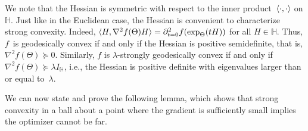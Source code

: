 \documentclass[aos]{imsart}
\theoremstyle{definition}
\numberwithin{equation}{section}
\renewcommand{\H}{{\mathbb{H}}}
\begin{document}
We note that the Hessian is symmetric with respect to the inner product~$\braket{\cdot,\cdot}$ on $\H$.
Just like in the Euclidean case, the Hessian is convenient to characterize strong convexity.
Indeed, $\braket{H, \nabla^2 f(\Theta) H} = \partial^2_{t=0} f(\exp_{\Theta}(tH))$ for all $H\in \H$.
Thus, $f$~is geodesically convex if and only if the Hessian is positive semidefinite, that is, $\nabla^2 f(\Theta) \succeq 0$. %
Similarly, $f$ is $\lambda$-strongly geodesically convex if and only if~$\nabla^2 f(\Theta) \succeq \lambda I_{\H}$, i.e., the Hessian is positive definite with eigenvalues larger than or equal to~$\lambda$.

We can now state and prove the following lemma, which shows that strong convexity in a ball about a point where the gradient is sufficiently small implies the optimizer cannot be far.
\end{document}
